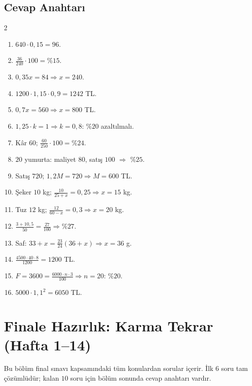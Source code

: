 \subsection*{Cevap Anahtarı}
{\small
\begin{multicols}{2}
\begin{enumerate}[label=\textbf{\arabic*.},leftmargin=*,itemsep=1pt]
\item \(640\cdot 0{,}15=96\).
\item \(\frac{36}{240}\cdot 100=\%15\).
\item \(0{,}35x=84\Rightarrow x=240\).
\item \(1200\cdot 1{,}15\cdot 0{,}9=1242\) TL.
\item \(0{,}7x=560\Rightarrow x=800\) TL.
\item \(1{,}25\cdot k=1\Rightarrow k=0{,}8\): \(\%20\) azaltılmalı.
\item Kâr \(60\); \(\frac{60}{250}\cdot 100=\%24\).
\item \(20\) yumurta: maliyet \(80\), satış \(100\) \(\Rightarrow\) \(\%25\).
\item Satış \(720\); \(1{,}2M=720\Rightarrow M=600\) TL.
\item Şeker \(10\) kg; \(\frac{10}{25+x}=0{,}25\Rightarrow x=15\) kg.
\item Tuz \(12\) kg; \(\frac{12}{60-x}=0{,}3\Rightarrow x=20\) kg.
\item \(\frac{3+10{,}5}{50}=\frac{27}{100}\Rightarrow\%27\).
\item Saf: \(33+x=\frac{23}{24}(36+x)\Rightarrow x=36\) g.
\item \(\frac{4500\cdot 40\cdot 8}{1200}=1200\) TL.
\item \(F=3600=\frac{6000\cdot n\cdot 3}{100}\Rightarrow n=20\): \(\%20\).
\item \(5000\cdot 1{,}1^2=6050\) TL.
\end{enumerate}
\end{multicols}}

\newenvironment{karma}[1]{\refstepcounter{karma}\par\medskip\needspace{9\baselineskip}\noindent\textbf{\color{anamavi}Soru \thekarma.}\ {\small\textit{(#1)}}\ }{\par}
\section{Finale Hazırlık: Karma Tekrar (Hafta 1--14)}
Bu bölüm final sınavı kapsamındaki tüm konulardan sorular içerir. İlk \(6\) soru tam çözümlüdür; kalan \(10\) soru için bölüm sonunda cevap anahtarı vardır.

